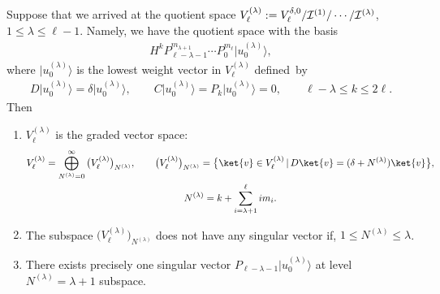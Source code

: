 \documentclass[pdftex]{sigma}
\numberwithin{equation}{section}
\begin{document}
\begin{lemma}
Suppose that we arrived at the quotient space $ V_{\ell}^{(\lambda)}:= V^{\delta,0}_{\ell}/{\cal I}^{(1)}/\cdots/{\cal
I}^{(\lambda)}$, $1 \leq \lambda \leq \ell-1$.
Namely, we have the quotient space with the basis
\begin{gather*}
H^k P_{\ell-\lambda-1}^{m_{\lambda+1}} \cdots P_0^{m_{\ell}} \big|u_0^{(\lambda)}\big\rangle ,
\end{gather*}
where $ \big|u_0^{(\lambda)}\big\rangle  $ is the lowest weight vector in $ V_{\ell}^{(\lambda)} $ defined~by
\begin{gather*}
D \big|u_0^{(\lambda)}\big\rangle  = \delta \big|u_0^{(\lambda)}\big\rangle ,
\qquad
C \big|u_0^{(\lambda)}\big\rangle  = P_k \big|u_0^{(\lambda)}\big\rangle  = 0, \qquad \ell-\lambda \leq k \leq 2\ell.
\end{gather*}
Then
\begin{enumerate}\itemsep=0pt
\item[$i)$] $ V_{\ell}^{(\lambda)} $ is the graded vector space:
\begin{gather*}
    V_{\ell}^{(\lambda)} = \bigoplus_{N^{(\lambda)}=0}^{\infty} \big(V_{\ell}^{(\lambda)}\big)_{N^{(\lambda)}},
\qquad
\big(V_{\ell}^{(\lambda)}\big)_{N^{(\lambda)}} = \big\{ \ket{v} \in V_{\ell}^{(\lambda)} \, | \, D \ket{v} = (\delta +
N^{(\lambda)}) \ket{v} \big\},
\nonumber
\\
    N^{(\lambda)} = k + \sum\limits_{i=\lambda+1}^{\ell} i m_i.
\end{gather*}
\item[$ii)$] The subspace $ \big(V_{\ell}^{(\lambda)}\big)_{N^{(\lambda)}} $ does not have any singular vector if, $ 1 \leq
N^{(\lambda)} \leq \lambda$.
\item[$iii)$] There exists precisely one singular vector $ P_{\ell-\lambda-1} \big|u_0^{(\lambda)}\big\rangle  $ at level $ N^{(\lambda)} =
\lambda + 1 $ subspace.
\end{enumerate}
\end{lemma}
\end{document}
